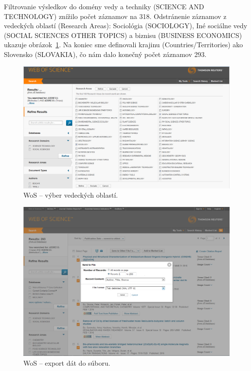 Filtrovanie výsledkov do domény vedy a techniky (SCIENCE AND TECHNOLOGY) znížilo
počet záznamov na 318.  Odstránenie záznamov z vedeckých oblastí (Research
Areas): Sociológia (SOCIOLOGY), Iné sociálne vedy (SOCIAL SCIENCES OTHER TOPICS)
a biznisu (BUSINESS ECONOMICS) ukazuje obrázok~\ref{fig:wos.areaselection}.  Na
koniec sme definovali krajinu (Countries/Territories) ako Slovensko (SLOVAKIA),
čo nám dalo konečný počet záznamov 293.

\begin{figure}
  \centering
  \includegraphics[width=\textwidth]{obr/wos04-cut.jpg}
  \caption{WoS -- výber vedeckých oblastí.}
  \label{fig:wos.areaselection}
\end{figure}

\begin{figure}
  \centering
  \includegraphics[width=\textwidth]{obr/wos06-cut.jpg}
  \caption{WoS -- export dát do súboru.}
  \label{fig:wos.export}
\end{figure}

